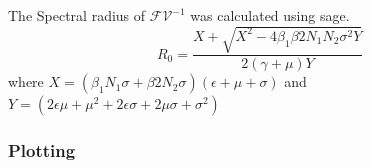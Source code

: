 \documentclass{article}
\begin{document}
The Spectral radius of $\mathcal{F}\mathcal{V}^{-1}$ was calculated using sage.
$$R_{0}=\frac{X+\sqrt{X^{2}-4\beta_{1}\beta{2}N_{1}N_{2} \sigma^{2} Y}}{2(\gamma+\mu)Y}$$ where $X=(\beta_{1} N_{1} \sigma+\beta{2} N_{2} \sigma)(\epsilon + \mu + \sigma)$ and $Y=(2 \epsilon \mu+\mu^{2}+2 \epsilon \sigma +2 \mu \sigma +\sigma^{2})$
\subsubsection{Plotting}
\end{document}
